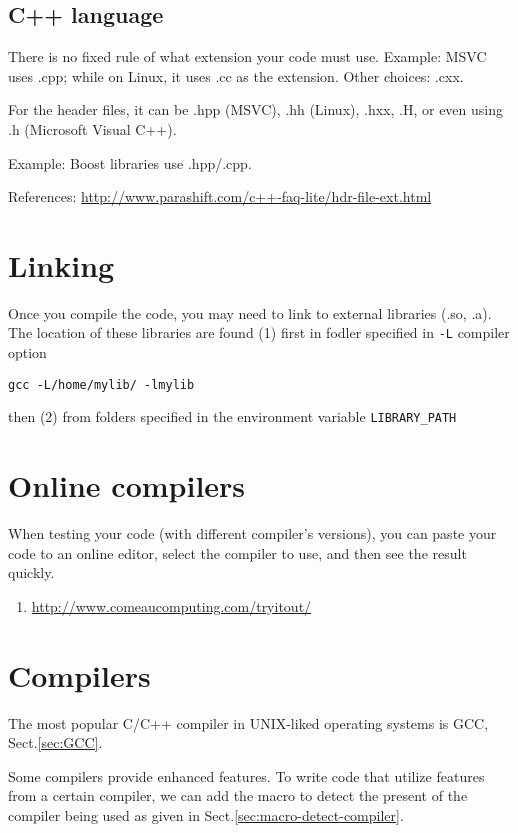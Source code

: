 \subsection{C++ language}

There is no fixed rule of what extension your code must use. Example: MSVC uses
.cpp; while on Linux, it uses .cc as the extension. Other choices: .cxx. 

For the header files, it can be .hpp (MSVC), .hh (Linux), .hxx, .H, or even
using .h (Microsoft Visual C++).


Example: Boost libraries use .hpp/.cpp. 

References: \url{http://www.parashift.com/c++-faq-lite/hdr-file-ext.html}

\section{Linking}
\label{sec:linking}

Once you compile the code, you may need to link to external libraries (.so, .a). 
The location of these libraries are found (1) first in fodler specified in
\verb!-L! compiler option
\begin{verbatim}
gcc -L/home/mylib/ -lmylib
\end{verbatim}
then (2) from folders specified in the environment variable
 \verb!LIBRARY_PATH!

\section{Online compilers}

When testing your code (with different compiler's versions), you can paste your
code to an online editor, select the compiler to use, and then see the result
quickly.

\begin{enumerate}
  \item \url{http://www.comeaucomputing.com/tryitout/}
\end{enumerate}

\section{Compilers}

The most popular C/C++ compiler in UNIX-liked operating systems is GCC,
Sect.\ref{sec:GCC}.


Some compilers provide enhanced features. To write code that utilize features
from a certain compiler, we can add the macro to detect the present of the
compiler being used as given in Sect.\ref{sec:macro-detect-compiler}.

